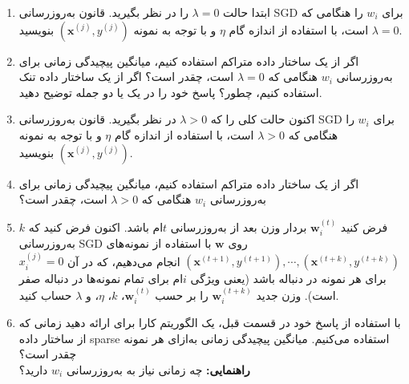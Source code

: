 \begin{enumerate}
    \item 

 ابتدا حالت \(\lambda = 0\) را در نظر بگیرید. قانون به‌روزرسانی SGD برای \(w_i\) را هنگامی که \(\lambda = 0\) است، با استفاده از اندازه گام \(\eta\) و با توجه به نمونه \((\mathbf{x}^{(j)}, y^{(j)})\) بنویسید.

\vspace{5cm}

\item
اگر از یک ساختار داده متراکم استفاده کنیم، میانگین پیچیدگی زمانی برای به‌روزرسانی \(w_i\) هنگامی که \(\lambda = 0\) است، چقدر است؟ اگر از یک ساختار داده تنک استفاده کنیم، چطور؟ پاسخ خود را در یک یا دو جمله توضیح دهید.

\vspace{5cm}

\item
 اکنون حالت کلی را که \(\lambda > 0\) در نظر بگیرید. قانون به‌روزرسانی SGD برای \(w_i\) را هنگامی که \(\lambda > 0\) است، با استفاده از اندازه گام \(\eta\) و با توجه به نمونه \((\mathbf{x}^{(j)}, y^{(j)})\) بنویسید.

\vspace{5cm}

\item
  اگر از یک ساختار داده متراکم استفاده کنیم، میانگین پیچیدگی زمانی برای به‌روزرسانی \(w_i\) هنگامی که \(\lambda > 0\) است، چقدر است؟

\vspace{5cm}

\item
 فرض کنید \(\mathbf{w}^{(t)}_i\) بردار وزن بعد از به‌روزرسانی \(t\)ام باشد. اکنون فرض کنید که \(k\) به‌روزرسانی SGD روی \(\mathbf{w}\) با استفاده از نمونه‌های \((\mathbf{x}^{(t+1)}, y^{(t+1)}), \cdots , (\mathbf{x}^{(t+k)}, y^{(t+k)})\) انجام می‌دهیم، که در آن \(x_i^{(j)} = 0\) برای هر نمونه در دنباله باشد (یعنی ویژگی \(i\)ام برای تمام نمونه‌ها در دنباله صفر است). وزن جدید \(\mathbf{w}^{(t+k)}_i\) را بر حسب \(\mathbf{w}^{(t)}_i\)، \(k\)، \(\eta\)، و \(\lambda\) حساب کنید.

\vspace{5cm}

\item
با استفاده از پاسخ خود در قسمت قبل، یک الگوریتم کارا برای  ارائه دهید زمانی که از ساختار داده sparse استفاده می‌کنیم. میانگین پیچیدگی زمانی به‌ازای هر نمونه چقدر است؟\\ \textbf{راهنمایی:} چه زمانی نیاز به به‌روزرسانی \(w_i\) دارید؟
\end{enumerate}
